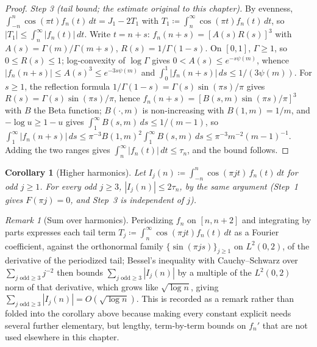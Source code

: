 \documentclass[11pt,a4paper]{article}
\theoremstyle{plain}
\newtheorem{corollary}[theorem]{Corollary}
\theoremstyle{definition}
\theoremstyle{remark}
\newtheorem{remark}[theorem]{Remark}
\numberwithin{equation}{section}
\begin{document}
\begin{proof}
\emph{Step 3 (tail bound; the estimate original to this chapter).} By evenness, $\int_{-n}^n\cos(\pi t)f_n(t)\,dt = J_1-2T_1$ with $T_1\coloneqq\int_n^\infty\cos(\pi t)f_n(t)\,dt$, so $|T_1|\le\int_n^\infty|f_n(t)|\,dt$. Write $t=n+s$: $f_n(n+s)=[A(s)R(s)]^3$ with $A(s)=\Gamma(m)/\Gamma(m+s)$, $R(s)=1/\Gamma(1-s)$. On $[0,1]$, $\Gamma\ge1$, so $0\le R(s)\le1$; log-convexity of $\log\Gamma$ gives $0<A(s)\le e^{-s\psi(m)}$, whence $|f_n(n+s)|\le A(s)^3\le e^{-3s\psi(m)}$ and $\int_0^1|f_n(n+s)|\,ds\le1/(3\psi(m))$. For $s\ge1$, the reflection formula $1/\Gamma(1-s)=\Gamma(s)\sin(\pi s)/\pi$ gives $R(s)=\Gamma(s)\sin(\pi s)/\pi$, hence $f_n(n+s)=[B(s,m)\sin(\pi s)/\pi]^3$ with $B$ the Beta function; $B(\cdot,m)$ is non-increasing with $B(1,m)=1/m$, and $-\log u\ge1-u$ gives $\int_1^\infty B(s,m)\,ds\le1/(m-1)$, so $\int_1^\infty|f_n(n+s)|\,ds\le\pi^{-3}B(1,m)^2\int_1^\infty B(s,m)\,ds\le\pi^{-3}m^{-2}(m-1)^{-1}$. Adding the two ranges gives $\int_n^\infty|f_n(t)|\,dt\le\tau_n$, and the bound follows.
\end{proof}

\begin{corollary}[Higher harmonics]
\label{cor:dixon_higher}
Let $I_j(n) \coloneqq \int_{-n}^n\cos(\pi jt)\,f_n(t)\,dt$ for odd $j\ge1$. For every odd $j\ge3$, $|I_j(n)|\le2\tau_n$, by the same argument (Step~1 gives $F(\pi j)=0$, and Step~3 is independent of $j$).
\end{corollary}

\begin{remark}[Sum over harmonics]
Periodizing $f_n$ on $[n,n+2]$ and integrating by parts expresses each tail term $T_j\coloneqq\int_n^\infty\cos(\pi jt)f_n(t)\,dt$ as a Fourier coefficient, against the orthonormal family $\{\sin(\pi js)\}_{j\ge1}$ on $L^2(0,2)$, of the derivative of the periodized tail; Bessel's inequality with Cauchy--Schwarz over $\sum_{j\text{ odd}\ge3}j^{-2}$ then bounds $\sum_{j\text{ odd}\ge3}|I_j(n)|$ by a multiple of the $L^2(0,2)$ norm of that derivative, which grows like $\sqrt{\log n}$, giving $\sum_{j\text{ odd}\ge3}|I_j(n)| = O(\sqrt{\log n})$. This is recorded as a remark rather than folded into the corollary above because making every constant explicit needs several further elementary, but lengthy, term-by-term bounds on $f_n'$ that are not used elsewhere in this chapter.
\end{remark}
\end{document}
